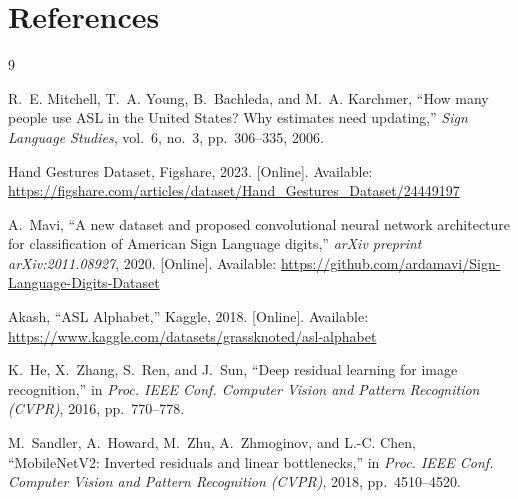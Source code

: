 \documentclass[11pt,a4paper]{article}
\begin{document}
\section*{References}
\begin{thebibliography}{9}

R.~E. Mitchell, T.~A. Young, B.~Bachleda, and M.~A. Karchmer, ``How many people use ASL in the United States? Why estimates need updating,'' \textit{Sign Language Studies}, vol.~6, no.~3, pp.~306--335, 2006.

Hand Gestures Dataset, Figshare, 2023. [Online]. Available: \url{https://figshare.com/articles/dataset/Hand_Gestures_Dataset/24449197}

A.~Mavi, ``A new dataset and proposed convolutional neural network architecture for classification of American Sign Language digits,'' \textit{arXiv preprint arXiv:2011.08927}, 2020. [Online]. Available: \url{https://github.com/ardamavi/Sign-Language-Digits-Dataset}

Akash, ``ASL Alphabet,'' Kaggle, 2018. [Online]. Available: \url{https://www.kaggle.com/datasets/grassknoted/asl-alphabet}

K.~He, X.~Zhang, S.~Ren, and J.~Sun, ``Deep residual learning for image recognition,'' in \textit{Proc. IEEE Conf. Computer Vision and Pattern Recognition (CVPR)}, 2016, pp.~770--778.

M.~Sandler, A.~Howard, M.~Zhu, A.~Zhmoginov, and L.-C. Chen, ``MobileNetV2: Inverted residuals and linear bottlenecks,'' in \textit{Proc. IEEE Conf. Computer Vision and Pattern Recognition (CVPR)}, 2018, pp.~4510--4520.

\end{thebibliography}
\end{document}
